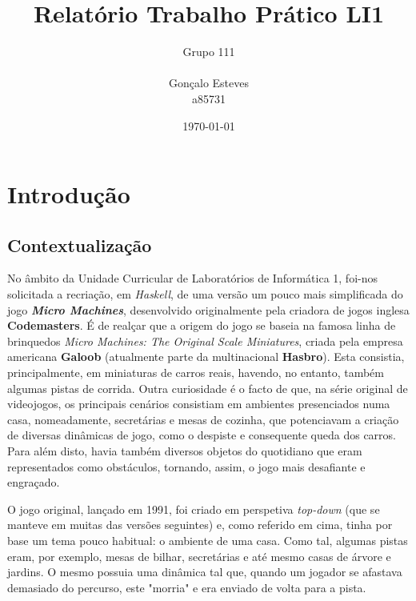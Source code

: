 \documentclass[a4paper]{report} %
\begin{document}
\title{Relatório Trabalho Prático LI1}
\author{Grupo 111\\
\\
Gonçalo Esteves
\\a85731}
\date{\today}

\maketitle

\tableofcontents





\chapter{Introdução}



  \section{Contextualização}
  
  No âmbito da Unidade Curricular de Laboratórios de Informática 1, foi-nos solicitada a recriação, em \textit{Haskell}, de uma versão um pouco mais simplificada do jogo \textbf{\textit{Micro Machines}},  desenvolvido originalmente pela criadora de jogos inglesa \textbf{Codemasters}.
  É de realçar que a origem do jogo se baseia na famosa linha de brinquedos \textit{Micro Machines: The Original Scale Miniatures}, criada pela empresa americana \textbf{Galoob} (atualmente parte da multinacional \textbf{Hasbro}). Esta consistia, principalmente, em miniaturas de carros reais, havendo, no entanto, também algumas pistas de corrida. Outra curiosidade é o facto de que, na série original de videojogos, os principais cenários consistiam em ambientes presenciados numa casa, nomeadamente, secretárias e mesas de cozinha, que potenciavam a criação de diversas dinâmicas de jogo, como o despiste e consequente queda dos carros. Para além disto, havia também diversos objetos do quotidiano que eram representados como obstáculos, tornando, assim, o jogo mais desafiante e engraçado.
  
  \hspace{1cm}
  
  \par \noindent O jogo original, lançado em 1991, foi criado em perspetiva \textit{top-down} (que se manteve em muitas das versões seguintes) e, como referido em cima, tinha por base um tema pouco habitual: o ambiente de uma casa. Como tal, algumas pistas eram, por exemplo, mesas de bilhar, secretárias e até mesmo casas de árvore e jardins. O mesmo possuia uma dinâmica tal que, quando um jogador se afastava demasiado do percurso, este "morria" e era enviado de volta para a pista. 
  
\end{document}

